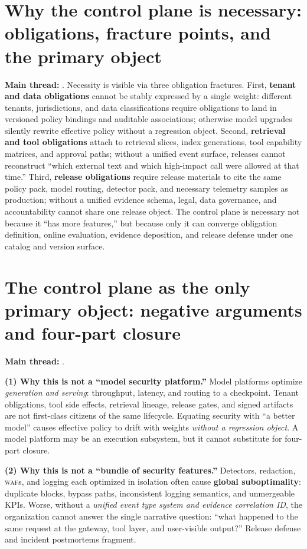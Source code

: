 \documentclass[11pt,a4paper]{report}
\begin{document}
\section{Why the control plane is necessary: obligations, fracture points, and the primary object}
\textbf{Main thread:} \ControlPlane{}. Necessity is visible via three obligation fractures. First, \textbf{tenant and data obligations} cannot be stably expressed by a single weight: different tenants, jurisdictions, and data classifications require obligations to land in versioned policy bindings and auditable associations; otherwise model upgrades silently rewrite effective policy without a regression object. Second, \textbf{retrieval and tool obligations} attach to retrieval slices, index generations, tool capability matrices, and approval paths; without a unified event surface, releases cannot reconstruct “which external text and which high-impact call were allowed at that time.” Third, \textbf{release obligations} require release materials to cite the same policy pack, model routing, detector pack, and necessary telemetry samples as production; without a unified evidence schema, legal, data governance, and accountability cannot share one release object. The control plane is necessary not because it “has more features,” but because only it can converge obligation definition, online evaluation, evidence deposition, and release defense under one catalog and version surface.

\section{The control plane as the only primary object: negative arguments and four-part closure}
\textbf{Main thread:} \ControlPlane{}.

\textbf{(1) Why this is not a “model security platform.”} Model platforms optimize \emph{generation and serving}: throughput, latency, and routing to a checkpoint. Tenant obligations, tool side effects, retrieval lineage, release gates, and signed artifacts are not first-class citizens of the same lifecycle. Equating security with “a better model” causes effective policy to drift with weights \emph{without a regression object}. A model platform may be an execution subsystem, but it cannot substitute for four-part closure.

\textbf{(2) Why this is not a “bundle of security features.”} Detectors, redaction, \textsc{waf}s, and logging each optimized in isolation often cause \textbf{global suboptimality}: duplicate blocks, bypass paths, inconsistent logging semantics, and unmergeable KPIs. Worse, without a \emph{unified event type system and evidence correlation ID}, the organization cannot answer the single narrative question: “what happened to the same request at the gateway, tool layer, and user-visible output?” Release defense and incident postmortems fragment.
\end{document}
